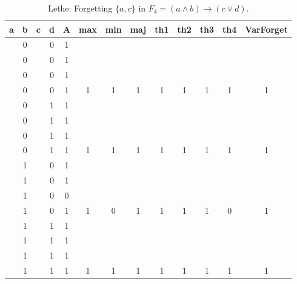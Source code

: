 \begin{table}[!tb]
    \centering
    \begin{tabular}{|c|c|c|c|c|c|c|c|c|c|c|c|c|}
        \hline
        \textbf{a} & \textbf{b} & \textbf{c} & \textbf{d} & \textbf{A} & \textbf{max} & \textbf{min} & \textbf{maj} & \textbf{th1} & \textbf{th2} & \textbf{th3} & \textbf{th4} & \textbf{VarForget} \\ \hline
        \rowcolor{gray!40}  & 0 &  & 0 & 1 &  &  &  &  &  &  &  &  \\ \hline
        \rowcolor{gray!40}  & 0 &  & 0 & 1 &  &  &  &  &  &  &  &  \\ \hline
        \rowcolor{gray!40}  & 0 &  & 0 & 1 &  &  &  &  &  &  &  &  \\ \hline
        \rowcolor{gray!40}  & 0 &  & 0 & 1 & 1 & 1 & 1 & 1 & 1 & 1 & 1 & 1 \\ \hline
        \rowcolor{blue!40}  & 0 &  & 1 & 1 &  &  &  &  &  &  &  &  \\ \hline
        \rowcolor{blue!40}  & 0 &  & 1 & 1 &  &  &  &  &  &  &  &  \\ \hline
        \rowcolor{blue!40}  & 0 &  & 1 & 1 &  &  &  &  &  &  &  &  \\ \hline
        \rowcolor{blue!40}  & 0 &  & 1 & 1 & 1 & 1 & 1 & 1 & 1 & 1 & 1 & 1 \\ \hline
        \rowcolor{red!40}  & 1 &  & 0 & 1 &  &  &  &  &  &  &  &  \\ \hline
        \rowcolor{red!40}  & 1 &  & 0 & 1 &  &  &  &  &  &  &  &  \\ \hline
        \rowcolor{red!40}  & 1 &  & 0 & 0 &  &  &  &  &  &  &  &  \\ \hline
        \rowcolor{red!40}  & 1 &  & 0 & 1 & 1 & 0 & 1 & 1 & 1 & 1 & 0 & 1 \\ \hline
        \rowcolor{green!40}  & 1 &  & 1 & 1 &  &  &  &  &  &  &  &  \\ \hline
        \rowcolor{green!40}  & 1 &  & 1 & 1 &  &  &  &  &  &  &  &  \\ \hline
        \rowcolor{green!40}  & 1 &  & 1 & 1 &  &  &  &  &  &  &  &  \\ \hline
        \rowcolor{green!40}  & 1 &  & 1 & 1 & 1 & 1 & 1 & 1 & 1 & 1 & 1 & 1 \\ \hline
    \end{tabular}
    \caption{Lethe: Forgetting $\{a, c\}$ in $F_{4} = (a \land b) \rightarrow (c \lor d)$.}
    \label{tab:lethe-F4-ac}
\end{table}
